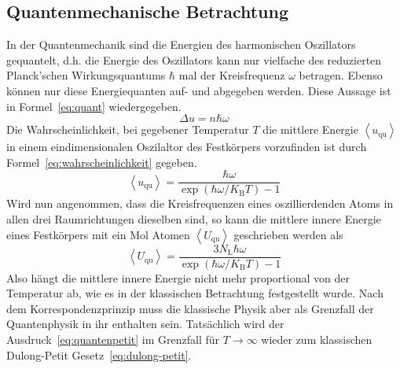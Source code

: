 \subsection{Quantenmechanische Betrachtung}
In der Quantenmechanik sind die Energien des harmonischen Oszillators 
gequantelt, d.h. die Energie des Oszillators kann nur vielfache des 
reduzierten Planck'schen Wirkungsquantums $\hbar$ mal der Kreisfrequenz 
$\omega$
betragen. Ebenso können nur diese Energiequanten auf- und abgegeben werden. 
Diese Aussage ist in Formel~\eqref{eq:quant} wiedergegeben.
%
\begin{equation}
\label{eq:quant}
\Delta u = n \hbar \omega
\end{equation}
%
Die Wahrscheinlichkeit, bei gegebener Temperatur $T$ die mittlere Energie 
$\left<u_\text{qu}\right>$ in einem eindimensionalen Oszilaltor des 
Festkörpers vorzufinden ist durch Formel~\eqref{eq:wahrscheinlichkeit} 
gegeben.
%
\begin{equation}
\label{eq:wahrscheinlichkeit}
\left<u_\text{qu}\right> = \frac{\hbar\omega}{\exp{(\hbar\omega/K_\text{B}T)}-1}
\end{equation}
%
Wird nun angenommen, dass die Kreisfrequenzen eines oszillierdenden 
Atoms in allen drei 
Raumrichtungen dieselben sind, so kann die mittlere innere Energie eines 
Festkörpers mit ein Mol Atomen $\left<U_\text{qu}\right>$ geschrieben 
werden als
%
\begin{equation}
\label{eq:quantenpetit}
\left<U_\text{qu}\right> = \frac{3N_\text{L}\hbar\omega}{\exp{(\hbar\omega/K_\text{B}T)}-1}
\end{equation}
%
Also hängt die mittlere innere Energie nicht mehr proportional von der 
Temperatur ab, wie es in der klassischen Betrachtung festgestellt wurde.
Nach dem Korrespondenzprinzip muss die klassische Physik aber als 
Grenzfall der Quantenphysik in ihr enthalten sein. Tatsächlich wird der 
Ausdruck~\eqref{eq:quantenpetit} im Grenzfall für $T \rightarrow \infty$ 
wieder zum klassischen Dulong-Petit Gesetz~\eqref{eq:dulong-petit}.